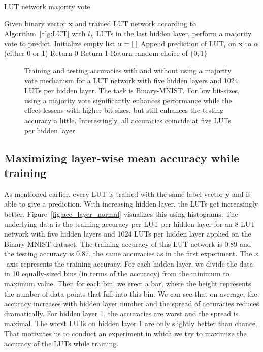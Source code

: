 \begin{algorithm}
  \caption{LUT network majority vote}
  \label{alg:majority_vote}
  \begin{algorithmic}
    \State Given binary vector $\bm{x}$ and trained LUT network according to Algorithm~\ref{alg:LUT} with $l_L$ LUTs in the last hidden layer, perform a majority vote to predict.
    \vspace{1em}
    \State Initialize empty list $\alpha = [\hspace{0.3em}]$
      \State Append prediction of LUT$_i$ on $\bm{x}$ to $\alpha$ (either 0 or 1)
    \EndFor
      \State Return 0
      \State Return 1
    \Else
      \State Return random choice of $\{0, 1\}$
    \EndIf
  \end{algorithmic}
\end{algorithm}
\FloatBarrier

\begin{figure}[!htb]
    \centering
    
    \caption{Training and testing accuracies with and without using a majority vote mechanism for a LUT network with five hidden layers and 1024 LUTs per hidden layer. The task is Binary-MNIST. For low bit-sizes, using a majority vote significantly enhances performance while the effect lessens with higher bit-sizes, but still enhances the testing accuracy a little. Interestingly, all accuracies coincide at five LUTs per hidden layer.}
\label{fig:majority_vote}
\end{figure}
\FloatBarrier

\subsection{Maximizing layer-wise mean accuracy while training} \label{sec:max_layer_acc}
As mentioned earlier, every LUT is trained with the same label vector $\bm{y}$ and is able to give a prediction. With increasing hidden layer, the LUTs get increasingly better. Figure~\ref{fig:acc_layer_normal} visualizes this using histograms. The underlying data is the training accuracy per LUT per hidden layer for an 8-LUT network with five hidden layers and 1024 LUTs per hidden layer applied on the Binary-MNIST dataset. The training accuracy of this LUT network is 0.89 and the testing accuracy is 0.87, the same accuracies as in the first experiment. The $x$-axis represents the training accuracy. For each hidden layer, we divide the data in 10 equally-sized bins (in terms of the accuracy) from the minimum to maximum value. Then for each bin, we erect a bar, where the height represents the number of data points that fall into this bin. We can see that on average, the accuracy increases with hidden layer number and the spread of accuracies reduces dramatically. For hidden layer 1, the accuracies are worst and the spread is maximal. The worst LUTs on hidden layer 1 are only slightly better than chance. That motivates us to conduct an experiment in which we try to maximize the accuracy of the LUTs while training.

